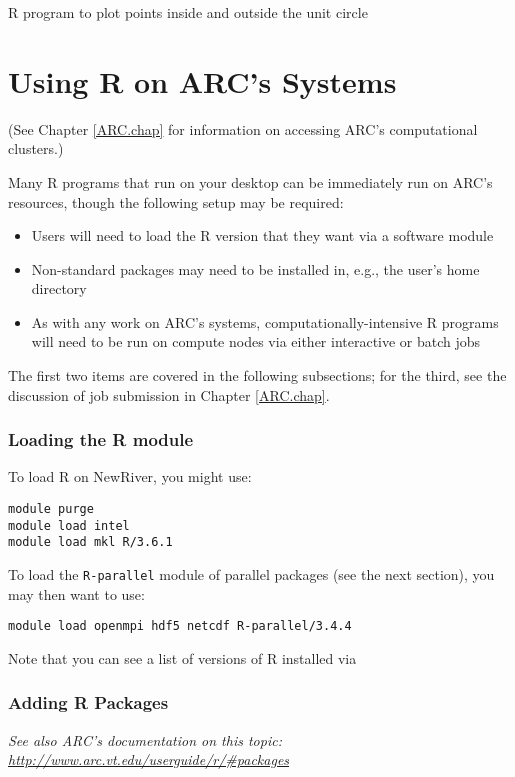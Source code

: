 \begin{listing}[ht]
\inputminted{R}{code/L22/mcpi_plot.r}
\caption{R program to plot points inside and outside the unit circle}
\label{pi.plot.list}
\end{listing}


\section{Using R on ARC's Systems}
(See Chapter \ref{ARC.chap} for information on accessing ARC's computational clusters.)

Many R programs that run on your desktop can be immediately run on ARC's resources, though the following setup may be required:
\begin{itemize}
    \item Users will need to load the R version that they want via a software module
    \item Non-standard packages may need to be installed in, e.g., the user's home directory
    \item As with any work on ARC's systems, computationally-intensive R programs will need to be run on compute nodes via either interactive or batch jobs
\end{itemize}
The first two items are covered in the following subsections; for the third, see the discussion of job submission in Chapter \ref{ARC.chap}.

\subsubsection{Loading the R module}
To load R on NewRiver, you might use:
\begin{verbatim}
module purge
module load intel
module load mkl R/3.6.1
\end{verbatim}
To load the \texttt{R-parallel} module of parallel packages (see the next section), you may then want to use:
\begin{verbatim}
module load openmpi hdf5 netcdf R-parallel/3.4.4
\end{verbatim}
Note that you can see a list of versions of R installed via 

\subsubsection{Adding R Packages}
\emph{See also ARC's documentation on this topic: \url{http://www.arc.vt.edu/userguide/r/\#packages}}

